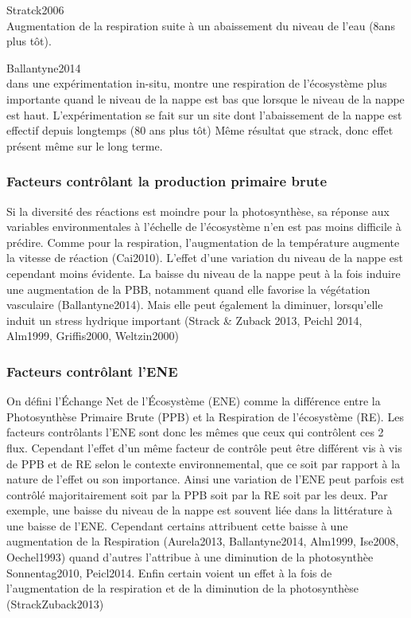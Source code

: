 Stratck2006 \\
Augmentation de la respiration suite à un abaissement du niveau de l'eau (8ans plus tôt).

Ballantyne2014 \\
dans une expérimentation in-situ, montre une respiration de l'écosystème plus importante quand le niveau de la nappe est bas que lorsque le niveau de la nappe est haut.
L'expérimentation se fait sur un site dont l'abaissement de la nappe est effectif depuis longtemps (80 ans plus tôt)
Même résultat que strack, donc effet présent même sur le long terme.

\subsubsection{Facteurs contrôlant la production primaire brute}
Si la diversité des réactions est moindre pour la photosynthèse, sa réponse aux variables environmentales à l'échelle de l'écosystème n'en est pas moins difficile à prédire.
Comme pour la respiration, l'augmentation de la température augmente la vitesse de réaction (Cai2010).
\plop
L'effet d'une variation du niveau de la nappe est cependant moins évidente.
La baisse du niveau de la nappe peut à la fois induire une augmentation de la PBB, notamment quand elle favorise la végétation vasculaire (Ballantyne2014).
Mais elle peut également la diminuer, lorsqu'elle induit un stress hydrique important (Strack \& Zuback 2013, Peichl 2014, Alm1999, Griffis2000, Weltzin2000)

\subsubsection{Facteurs contrôlant l'ENE}
On défini l'Échange Net de l'Écosystème (ENE) comme la différence entre la Photosynthèse Primaire Brute (PPB) et la Respiration de l'écosystème (RE).
Les facteurs contrôlants l'ENE sont donc les mêmes que ceux qui contrôlent ces 2 flux.
Cependant l'effet d'un même facteur de contrôle peut être différent vis à vis de PPB et de RE selon le contexte environnemental, que ce soit par rapport à la nature de l'effet ou son importance.
Ainsi une variation de l'ENE peut parfois est contrôlé majoritairement soit par la PPB soit par la RE soit par les deux.
Par exemple, une baisse du niveau de la nappe est souvent liée dans la littérature à une baisse de l'ENE.
Cependant certains attribuent cette baisse à une augmentation de la Respiration (Aurela2013, Ballantyne2014, Alm1999, Ise2008, Oechel1993) quand d'autres l'attribue à une diminution de la photosynthèe Sonnentag2010, Peicl2014.
Enfin certain voient un effet à la fois de l'augmentation de la respiration et de la diminution de la photosynthèse (StrackZuback2013)

